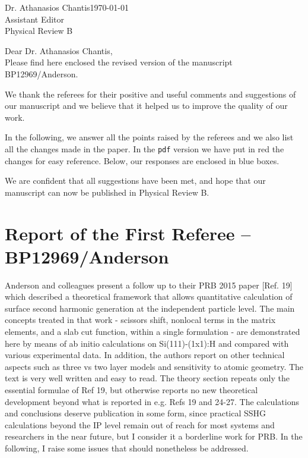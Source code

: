 \documentclass[11pt]{article}
\begin{document}
Dr. Athanasios Chantis\hfill{\today}\\
Assistant Editor\\
Physical Review B

Dear Dr. Athanasios Chantis,\\

Please find here enclosed the revised version of the manuscript
BP12969/Anderson.

We thank the referees for their positive and useful comments and suggestions of
our manuscript and we believe that it helped us to improve the quality of our
work.

In the following, we answer all the points raised by the referees and we also
list all the changes made in the paper. In the \verb=pdf=  version we have put
in red the changes for easy reference. Below, our responses are enclosed in blue
boxes.

We are confident that all suggestions have been met, and hope that our
manuscript can now be published in Physical Review B.


\section{Report of the First Referee -- BP12969/Anderson}

Anderson and colleagues present a follow up to their PRB 2015 paper [Ref. 19]
which described a theoretical framework that allows quantitative calculation of
surface second harmonic generation at the independent particle level. The main
concepts treated in that work - scissors shift, nonlocal terms in the matrix
elements, and a slab cut function, within a single formulation - are
demonstrated here by means of ab initio calculations on Si(111)-(1x1):H and
compared with various experimental data. In addition, the authors report on
other technical aspects such as three vs two layer models and sensitivity to
atomic geometry. The text is very well written and easy to read. The theory
section repeats only the essential formulae of Ref 19, but otherwise reports no
new theoretical development beyond what is reported in e.g. Refs 19 and 24-27.
The calculations and conclusions deserve publication in some form, since
practical SSHG calculations beyond the IP level remain out of reach for most
systems and researchers in the near future, but I consider it a borderline work
for PRB. In the following, I raise some issues that should nonetheless be
addressed.
\end{document}

